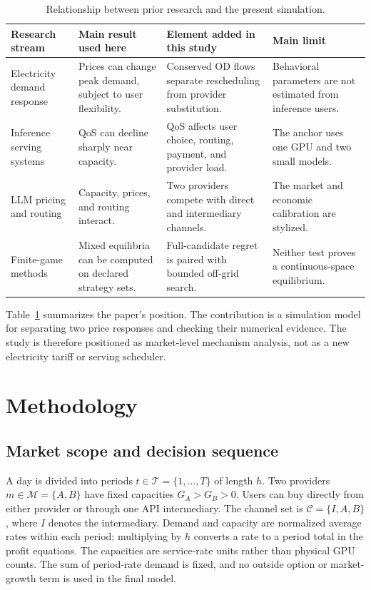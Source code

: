 \documentclass[11pt,a4paper]{article}
\newcommand{\T}{\mathcal{T}}
\newcommand{\M}{\mathcal{M}}
\newcommand{\Channels}{\mathcal{C}}
\begin{document}
\begin{table}[H]
\centering
\caption{Relationship between prior research and the present simulation.}
\label{tab:positioning}
\small
\begin{tabular}{@{}>{\raggedright\arraybackslash}p{}>{\raggedright\arraybackslash}p{}>{\raggedright\arraybackslash}p{}>{\raggedright\arraybackslash}p{}@{}}
\toprule
Research stream & Main result used here & Element added in this study & Main limit \\
\midrule
Electricity demand response & Prices can change peak demand, subject to user flexibility. & Conserved OD flows separate rescheduling from provider substitution. & Behavioral parameters are not estimated from inference users. \\
Inference serving systems & QoS can decline sharply near capacity. & QoS affects user choice, routing, payment, and provider load. & The anchor uses one GPU and two small models. \\
LLM pricing and routing & Capacity, prices, and routing interact. & Two providers compete with direct and intermediary channels. & The market and economic calibration are stylized. \\
Finite-game methods & Mixed equilibria can be computed on declared strategy sets. & Full-candidate regret is paired with bounded off-grid search. & Neither test proves a continuous-space equilibrium. \\
\bottomrule
\end{tabular}
\end{table}

Table~\ref{tab:positioning} summarizes the paper's position. The contribution is a simulation model for separating two price responses and checking their numerical evidence. The study is therefore positioned as market-level mechanism analysis, not as a new electricity tariff or serving scheduler.

\section{Methodology}
\label{sec:methodology}

\subsection{Market scope and decision sequence}

A day is divided into periods $t\in\T=\{1,\ldots,T\}$ of length $h$. Two providers $m\in\M=\{A,B\}$ have fixed capacities $G_A>G_B>0$. Users can buy directly from either provider or through one API intermediary. The channel set is $\Channels=\{I,A,B\}$, where $I$ denotes the intermediary. Demand and capacity are normalized average rates within each period; multiplying by $h$ converts a rate to a period total in the profit equations. The capacities are service-rate units rather than physical GPU counts. The sum of period-rate demand is fixed, and no outside option or market-growth term is used in the final model.
\end{document}

